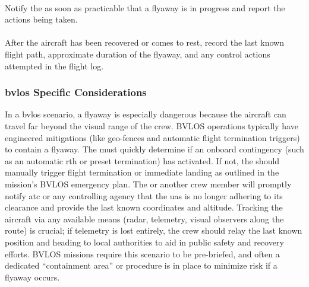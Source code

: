                 \paragraph{} Notify the  as soon as practicable that a flyaway is in progress and report the actions being taken.
                
                \paragraph{} After the aircraft has been recovered or comes to rest, record the last known flight path, approximate duration of the flyaway, and any control actions attempted in the flight log.
 
            \subsubsection{\ac{bvlos} Specific Considerations} In a \ac{bvlos} scenario, a flyaway is especially dangerous because the aircraft can travel far beyond the visual range of the crew. BVLOS operations typically have engineered mitigations (like geo-fences and automatic flight termination triggers) to contain a flyaway. The  must quickly determine if an onboard contingency (such as an automatic \ac{rth} or preset termination) has activated. If not, the  should manually trigger flight termination or immediate landing as outlined in the mission’s BVLOS emergency plan. The  or another crew member will promptly notify \ac{atc} or any controlling agency that the \ac{uas} is no longer adhering to its clearance and provide the last known coordinates and altitude. Tracking the aircraft via any available means (radar, telemetry, visual observers along the route) is crucial; if telemetry is lost entirely, the crew should relay the last known position and heading to local authorities to aid in public safety and recovery efforts. BVLOS missions require this scenario to be pre-briefed, and often a dedicated “containment area” or procedure is in place to minimize risk if a flyaway occurs.
 
